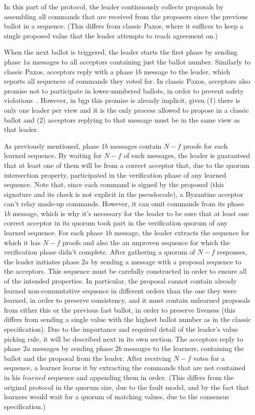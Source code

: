 In this part of the protocol, the leader continuously collects proposals by assembling all commands that are received from the proposers since the previous ballot in a sequence. (This differs from classic Paxos, where it suffices to keep a single proposed value that the leader attempts to reach agreement on.)

When the next ballot is triggered, the leader starts the first phase by sending phase $1a$ messages to all acceptors containing just the ballot number. Similarly to classic Paxos, acceptors reply with a phase $1b$ message to the leader, which reports all sequences of commands they voted for. In classic Paxos, acceptors also promise not to participate in lower-numbered ballots, in order to prevent safety violations~\cite{Lam98}. However, in \acrshort{bgp} this promise is already implicit, given (1) there is only one leader per view and it is the only process allowed to propose in a classic ballot and (2) acceptors replying to that message must be in the same view as that leader.

As previously mentioned, phase $1b$ messages contain $N-f$ proofs for each learned sequence. By waiting for $N-f$ of such messages, the leader is guaranteed that at least one of them will be from a correct acceptor that, due to the quorum intersection property, participated in the verification phase of any learned sequence. Note that, since each command is signed by the proposed (this signature and its check is not explicit in the pseudocode), a Byzantine acceptor can't relay made-up commands. However, it can omit commands from its phase $1b$ message, which is why it's necessary for the leader to be sure that at least one correct acceptor in its quorum took part in the verification quorum of any learned sequence. For each phase $1b$ message, the leader extracts the sequence for which it has $N-f$ proofs and also the an unproven sequence for which the verification phase didn't complete. After gathering a quorum of $N-f$ responses, the leader initiates phase $2a$ by sending a message with a proposal sequence to the acceptors. This sequence must be carefully constructed in order to ensure all of the intended properties. In particular, the proposal cannot contain already learned non-commutative sequence in different orders than the one they were learned, in order to preserve consistency, and it must contain unlearned proposals from either this or the previous fast ballot, in order to preserve liveness (this differs from sending a single value with the highest ballot number as in the classic specification). Due to the importance and required detail of the leader's value picking rule, it will be described next in its own section. The acceptors reply to phase $2a$ messages by sending phase $2b$ messages to the learners, containing the ballot and the proposal from the leader. After receiving $N-f$ votes for a sequence, a learner learns it by extracting the commands that are not contained in his $learned$ sequence and appending them in order. (This differs from the original protocol in the quorum size, due to the fault model, and by the fact that learners would wait for a quorum of matching values, due to the consensus specification.)\par

